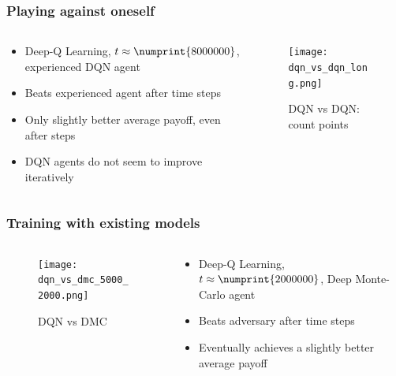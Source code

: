 
\begin{frame}
\frametitle{Playing against oneself}
\begin{columns}[c]

\begin{column}{.5\textwidth}
\begin{itemize}
\item Deep-Q Learning, $t \approx \numprint{8000000}$, experienced DQN agent
\item Beats experienced agent after  time steps
\item Only slightly better average payoff, even after  steps
\item DQN agents do not seem to improve iteratively
\end{itemize}
\end{column}

\begin{column}{.5\textwidth}
\begin{figure}
\texttt{[image: dqn\_vs\_dqn\_long.png]}
\caption{DQN vs DQN: count points}
\end{figure}
\end{column}

\end{columns}
\end{frame}


\begin{frame}
\frametitle{Training with existing models}
\begin{columns}[c]

\begin{column}{.5\textwidth}
\begin{figure}
\texttt{[image: dqn\_vs\_dmc\_5000\_2000.png]}
\caption{DQN vs DMC}
\end{figure}
\end{column}

\begin{column}{.5\textwidth}
\begin{itemize}
\item Deep-Q Learning, $t \approx \numprint{2000000}$, Deep Monte-Carlo agent
\item Beats adversary after  time steps
\item Eventually achieves a slightly better average payoff
\end{itemize}
\end{column}

\end{columns}
\end{frame}

